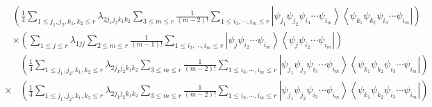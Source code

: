 \documentclass[aps,preprint]{revtex4}%
\begin{document}
\begin{align}
&  \left(  \frac{1}{4}\sum_{1\leq j_{1},j_{2},k_{1},k_{2}\leq r}%
\lambda_{2j_{1}j_{2}k_{1}k_{2}}\sum_{3\leq m\leq r}\frac{1}{\left(
m-2\right)  !}\sum_{1\leq i_{3},\cdots,i_{m}\leq r}\left\vert \psi_{j_{1}}%
\psi_{j_{2}}\psi_{i_{3}}\cdots\psi_{i_{m}}\right\rangle \left\langle
\psi_{k_{1}}\psi_{k_{2}}\psi_{i_{3}}\cdots\psi_{i_{m}}\right\vert \right) \\
&  \times\left(  \sum_{1\leq j\leq r}\lambda_{1jj}\sum_{2\leq m\leq r}\frac
{1}{\left(  m-1\right)  !}\sum_{1\leq i_{2},\cdots,i_{m}\leq r}\left\vert
\psi_{j}\psi_{i_{2}}\cdots\psi_{i_{m}}\right\rangle \left\langle \psi_{j}%
\psi_{i_{2}}\cdots\psi_{i_{m}}\right\vert \right)
\end{align}%
\begin{align}
&  \left(  \frac{1}{4}\sum_{1\leq j_{1},j_{2},k_{1},k_{2}\leq r}%
\lambda_{2j_{1}j_{2}k_{1}k_{2}}\sum_{3\leq m\leq r}\frac{1}{\left(
m-2\right)  !}\sum_{1\leq i_{3},\cdots,i_{m}\leq r}\left\vert \psi_{j_{1}}%
\psi_{j_{2}}\psi_{i_{3}}\cdots\psi_{i_{m}}\right\rangle \left\langle
\psi_{k_{1}}\psi_{k_{2}}\psi_{i_{3}}\cdots\psi_{i_{m}}\right\vert \right) \\
\times &  \left(  \frac{1}{4}\sum_{1\leq j_{1},j_{2},k_{1},k_{2}\leq r}%
\lambda_{2j_{1}j_{2}k_{1}k_{2}}\sum_{3\leq m\leq r}\frac{1}{\left(
m-2\right)  !}\sum_{1\leq i_{3},\cdots,i_{m}\leq r}\left\vert \psi_{j_{1}}%
\psi_{j_{2}}\psi_{i_{3}}\cdots\psi_{i_{m}}\right\rangle \left\langle
\psi_{k_{1}}\psi_{k_{2}}\psi_{i_{3}}\cdots\psi_{i_{m}}\right\vert \right)
\end{align}
\end{document}
